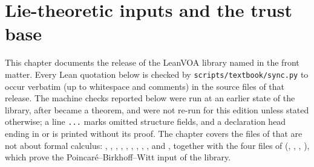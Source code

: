 \chapter{Lie-theoretic inputs and the trust base}\label{ch:L02}
\begingroup\setlength{\emergencystretch}{3em}

\providecommand{\ltwog}{\mathfrak{g}}
\providecommand{\ltwoghat}{\widehat{\mathfrak{g}}}
\providecommand{\ltwop}{\mathfrak{p}}
\providecommand{\ltwon}{\mathfrak{n}}
\providecommand{\ltwovac}{|0\rangle}
\providecommand{\ltwoW}{\mathfrak{W}}
\providecommand{\ltwoVir}{\mathfrak{Vir}}
\providecommand{\ltwoUe}{\mathcal{U}}
\providecommand{\ltwoInd}{\operatorname{Ind}}
\providecommand{\ltwoJ}{\mathcal{J}}
\providecommand{\ltwoV}{\mathcal{V}}

This chapter documents the release of the LeanVOA library named in the front matter. Every Lean quotation below is checked by \texttt{scripts/textbook/sync.py}
to occur verbatim (up to whitespace and comments) in the source files of that release. The machine
checks reported below were run at an earlier state of the library, after  became a theorem,
and were not re-run for this edition unless stated otherwise; a line \texttt{...} marks omitted structure fields, and a declaration head
ending in  or \lean{:=} is printed without its proof. The chapter covers the files of
 that are not about formal calculus:
, , ,
, , ,
, , ,
 and , together with the four files of
 (,
, , ), which prove the
Poincar\'e--Birkhoff--Witt input of the library.

